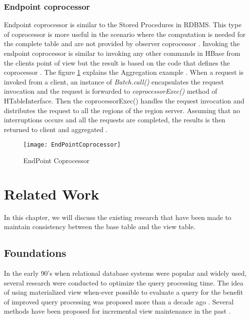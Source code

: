 \documentclass[11pt,a4paper,bibtotoc,idxtotoc,headsepline,footsepline,footexclude,BCOR12mm,DIV13]{scrbook}
\begin{document}
\newpage
\subsection{Endpoint coprocessor}

Endpoint coprocessor is similar to the Stored Procedures in RDBMS. This type of coprocessor is more useful in the scenario where the computation is needed for the complete table and are not provided by observer coprocessor \cite{hbase:coprocessors}. Invoking the endpoint coprocessor is similar to invoking any other commands in HBase from the client\textquotesingle s point of view but the result is based on the code that defines the coprocessor \cite{coprocessor:detail}. The figure \ref{Endpoint Coprocessor} explains the Aggregation example \cite{coprocessor:detail}.
When a request is invoked from a client, an instance of \emph{Batch.call()} encapsulates the request invocation and the request is forwarded to \emph{coprocessorExec()} method of HTableInterface. Then the coprocessorExec() handles the request invocation and distributes the request to all the regions of the region server. Assuming that no interruptions occurs and all the requests are completed, the results is then returned to client and aggregated \cite{coprocessor:detail}.

\begin{figure}[h!]
    \centering
    \texttt{[image: EndPointCoprocessor]}
    \caption{EndPoint Coprocessor}
    \label{Endpoint Coprocessor}
    
\end{figure}


\chapter{Related Work}
\label{chap:relatedwork}
In this chapter, we will discuss the existing research that have been made to maintain consistency between the base table and the view table.

\section{Foundations}
\label{Foundations}
In the early 90's when relational database systems were popular and widely used, several research were conducted to optimize the query processing time. The idea of using materialized view when-ever possible to evaluate a query for the benefit of improved query processing was proposed more than a decade ago \cite{maintenance:optimizingqueries}. Several methods have been proposed for incremental view maintenance in the past \cite{blakeley:efficiently, gupta:maintaining, agrawal:efficient}.
\end{document}
